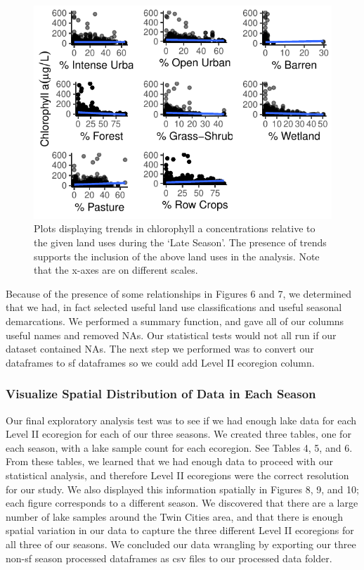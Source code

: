 \documentclass[12pt,]{article}
\begin{document}
\begin{figure}
\centering
\includegraphics{Bollt_Greif_Raby_Roth_Project_Final_files/figure-latex/unnamed-chunk-9-1.pdf}
\caption{Plots displaying trends in chlorophyll a concentrations
relative to the given land uses during the `Late Season'. The presence
of trends supports the inclusion of the above land uses in the analysis.
Note that the x-axes are on different scales.}
\end{figure}

Because of the presence of some relationships in Figures 6 and 7, we
determined that we had, in fact selected useful land use classifications
and useful seasonal demarcations. We performed a summary function, and
gave all of our columns useful names and removed NAs. Our statistical
tests would not all run if our dataset contained NAs. The next step we
performed was to convert our dataframes to sf dataframes so we could add
Level II ecoregion column.

\hypertarget{visualize-spatial-distribution-of-data-in-each-season}{%
\subsubsection{Visualize Spatial Distribution of Data in Each
Season}\label{visualize-spatial-distribution-of-data-in-each-season}}

Our final exploratory analysis test was to see if we had enough lake
data for each Level II ecoregion for each of our three seasons. We
created three tables, one for each season, with a lake sample count for
each ecoregion. See Tables 4, 5, and 6. From these tables, we learned
that we had enough data to proceed with our statistical analysis, and
therefore Level II ecoregions were the correct resolution for our study.
We also displayed this information spatially in Figures 8, 9, and 10;
each figure corresponds to a different season. We discovered that there
are a large number of lake samples around the Twin Cities area, and that
there is enough spatial variation in our data to capture the three
different Level II ecoregions for all three of our seasons. We concluded
our data wrangling by exporting our three non-sf season processed
dataframes as csv files to our processed data folder.
\end{document}

